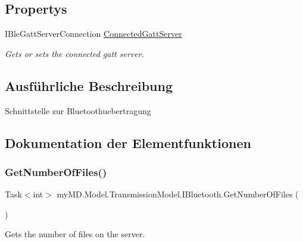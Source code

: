 \subsection*{Propertys}
\begin{DoxyCompactItemize}
\item 
I\+Ble\+Gatt\+Server\+Connection \mbox{\hyperlink{interfacemy_m_d_1_1_model_1_1_transmission_model_1_1_i_bluetooth_a803c3867d855403d8adb458753ab2315}{Connected\+Gatt\+Server}}
\begin{DoxyCompactList}\small\item\em Gets or sets the connected gatt server. \end{DoxyCompactList}\end{DoxyCompactItemize}


\subsection{Ausführliche Beschreibung}
Schnittstelle zur Bluetoothuebertragung 



\subsection{Dokumentation der Elementfunktionen}
\mbox{\label{interfacemy_m_d_1_1_model_1_1_transmission_model_1_1_i_bluetooth_a969f7d364636d505afc12ba4871c4b02}} 
\subsubsection{\texorpdfstring{Get\+Number\+Of\+Files()}{GetNumberOfFiles()}}
{\footnotesize\ttfamily Task$<$int$>$ my\+M\+D.\+Model.\+Transmission\+Model.\+I\+Bluetooth.\+Get\+Number\+Of\+Files (\begin{DoxyParamCaption}{ }\end{DoxyParamCaption})}



Gets the number of files on the server. 


